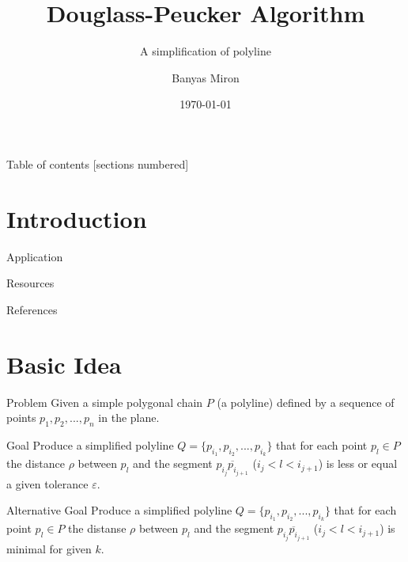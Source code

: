 \documentclass[10pt]{beamer}
\title{Douglass-Peucker Algorithm}
\subtitle{A simplification of polyline}
\date{\today}
\author{Banyas Miron}
\institute{Kyiv Algorithms Club}
\begin{document}
\maketitle

\begin{frame}{Table of contents}
  [sections numbered]
  \tableofcontents[hideallsubsections]
\end{frame}

\section{Introduction}

\begin{frame}{Application}
\end{frame}
\begin{frame}{Resources}
\end{frame}
\begin{frame}{References}
\end{frame}

\section{Basic Idea}

\begin{frame}{Problem}
Given a simple polygonal chain $P$  (a polyline) defined by a sequence of points $p_{1},p_{2},...,p_{n}$ in the plane. 

\begin{alertblock}{Goal}
Produce a simplified polyline  $Q=\{p_{i_{1}},p_{i_{2}},...,p_{i_{k}}\}$
that for each point $p_{l}\in P$ the distance $\rho$ between $p_{l}$
and the segment $\overline{p_{i_{j}}p_{i_{j+1}}}$ ($i_{j} < l < i_{j+1}$) 
is less or equal a given tolerance $\varepsilon$.
\end{alertblock}

\begin{alertblock}{Alternative Goal}
Produce a simplified polyline  $Q=\{p_{i_{1}},p_{i_{2}},...,p_{i_{k}}\}$
that  for each point $p_{l}\in P$ the distanse $\rho$ between $p_{l}$
and the segment $\overline{p_{i_{j}}p_{i_{j+1}}}$ ($i_{j} < l < i_{j+1}$)   
is  minimal for given $k$.
\end{alertblock}

\end{frame}
\end{document}
